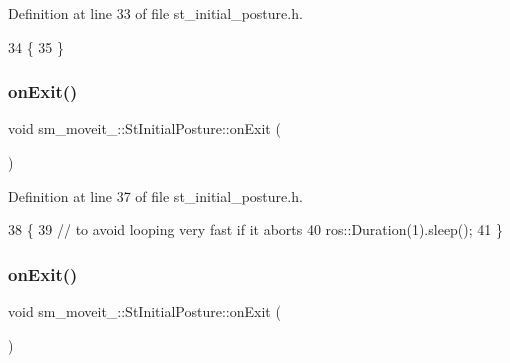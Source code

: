 Definition at line 33 of file st\+\_\+initial\+\_\+posture.\+h.


\begin{DoxyCode}
34         \{
35         \}
\end{DoxyCode}
\mbox{\label{structsm__moveit__4_1_1StInitialPosture_a2773a03a41fa526fc3be1371245886a5}} 
\subsubsection{\texorpdfstring{on\+Exit()}{onExit()}\hspace{0.1cm}{\footnotesize\ttfamily [2/3]}}
{\footnotesize\ttfamily void sm\+\_\+moveit\+\_\+::\+St\+Initial\+Posture\+::on\+Exit (\begin{DoxyParamCaption}\item[{\hyperlink{structsmacc_1_1default__transition__tags_1_1ABORT}{A\+B\+O\+RT}}]{ }\end{DoxyParamCaption})\hspace{0.3cm}{\ttfamily [inline]}}



Definition at line 37 of file st\+\_\+initial\+\_\+posture.\+h.


\begin{DoxyCode}
38         \{
39             \textcolor{comment}{// to avoid looping very fast if it aborts}
40             ros::Duration(1).sleep();
41         \}
\end{DoxyCode}
\mbox{\label{structsm__moveit__4_1_1StInitialPosture_a13d072d68463d6aeafb5e07dbec2aaa2}} 
\subsubsection{\texorpdfstring{on\+Exit()}{onExit()}\hspace{0.1cm}{\footnotesize\ttfamily [3/3]}}
{\footnotesize\ttfamily void sm\+\_\+moveit\+\_\+::\+St\+Initial\+Posture\+::on\+Exit (\begin{DoxyParamCaption}{ }\end{DoxyParamCaption})\hspace{0.3cm}{\ttfamily [inline]}}



